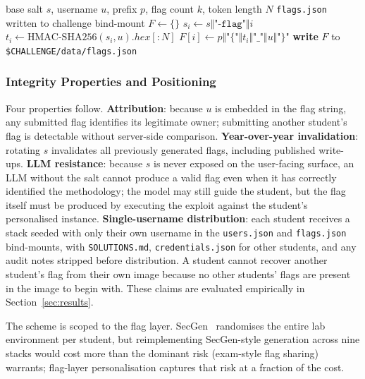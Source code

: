\begin{algorithm}[t]
\caption{Per-user flag generation pipeline}
\label{alg:flag-gen}
\small
\begin{algorithmic}[1]
\Require base salt $s$, username $u$, prefix $p$, flag count $k$, token length $N$
\Ensure \texttt{flags.json} written to challenge bind-mount
\State $F \gets \{\}$
  \State $s_i \gets s \Vert \texttt{"-flag"} \Vert i$ 
  \State $t_i \gets \mathrm{HMAC\text{-}SHA256}(s_i, u).\mathit{hex}[{:}N]$
  \State $F[i] \gets p \Vert \texttt{"\{"} \Vert t_i \Vert \texttt{"\_"} \Vert u \Vert \texttt{"\}"}$
\EndFor
\State \textbf{write} $F$ to \texttt{\$CHALLENGE/data/flags.json}
\end{algorithmic}
\end{algorithm}

\subsubsection{Integrity Properties and Positioning}

Four properties follow.
\textbf{Attribution}: because $u$ is embedded in the flag
string, any submitted flag identifies its legitimate owner;
submitting another student's flag is detectable without
server-side comparison. \textbf{Year-over-year invalidation}:
rotating $s$ invalidates all previously generated flags,
including published write-ups. \textbf{LLM resistance}:
because $s$ is never exposed on the user-facing surface, an
LLM without the salt cannot produce a valid flag even when it
has correctly identified the methodology; the model may still
guide the student, but the flag itself must be produced by
executing the exploit against the student's personalised
instance. \textbf{Single-username distribution}: each student
receives a stack seeded with only their own username in the
\texttt{users.json} and \texttt{flags.json} bind-mounts, with
\texttt{SOLUTIONS.md}, \texttt{credentials.json} for other
students, and any audit notes stripped before distribution.
A student cannot recover another student's flag from their
own image because no other students' flags are present in
the image to begin with. These claims are evaluated
empirically in Section~\ref{sec:results}.

The scheme is scoped to the flag layer.
SecGen~\cite{secgen2017} randomises the entire lab
environment per student, but reimplementing SecGen-style
generation across nine stacks would cost more than the
dominant risk (exam-style flag sharing) warrants; flag-layer
personalisation captures that risk at a fraction of the cost.

